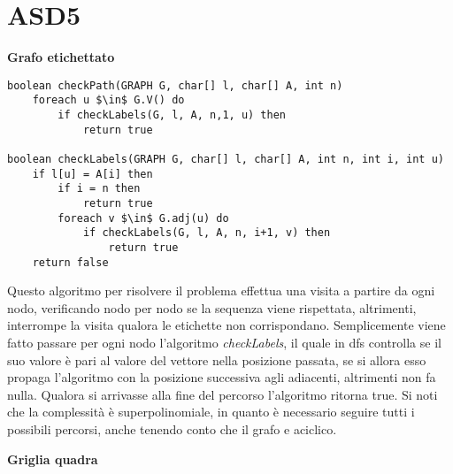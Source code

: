 \documentclass[../cheatSheetAlgoritmi.tex]{subfiles}
\begin{document}
\section{ASD5}
\textbf{Grafo etichettato}
\begin{lstlisting}[caption=Il grafo contiene la sottosequenza LODE?]
boolean checkPath(GRAPH G, char[] l, char[] A, int n)
	foreach u $\in$ G.V() do
    	if checkLabels(G, l, A, n,1, u) then
      		return true

boolean checkLabels(GRAPH G, char[] l, char[] A, int n, int i, int u)
	if l[u] = A[i] then
    	if i = n then
      		return true
    	foreach v $\in$ G.adj(u) do
      		if checkLabels(G, l, A, n, i+1, v) then
        		return true
  	return false
\end{lstlisting}
Questo algoritmo per risolvere il problema effettua una visita a
partire da ogni nodo, verificando nodo per nodo se la sequenza viene rispettata, altrimenti, interrompe la
visita qualora le etichette non corrispondano. Semplicemente viene fatto passare per ogni nodo l'algoritmo \textit{checkLabels}, il quale in dfs controlla se il suo valore è pari al valore del vettore nella posizione passata, se si allora esso propaga l'algoritmo con la posizione successiva agli adiacenti, altrimenti non fa nulla. Qualora si arrivasse alla fine del percorso l'algoritmo ritorna true. Si noti che la complessità è superpolinomiale, in quanto è
necessario seguire tutti i possibili percorsi, anche tenendo conto che il
grafo e aciclico.

\textbf{Griglia quadra}
\end{document}
